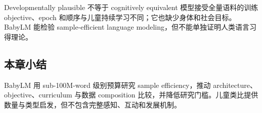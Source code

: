 \begin{warningbox}{Developmentally plausible 不等于 cognitively equivalent}
模型接受全量语料的训练 objective、epoch 和顺序与儿童持续学习不同；它也缺少身体和社会目标。BabyLM 能检验 sample-efficient language modeling，但不能单独证明人类语言习得理论。
\end{warningbox}


\subsection{本章小结}

BabyLM 用 sub-100M-word 级别预算研究 sample efficiency，推动 architecture、objective、curriculum 与数据 composition 比较，并降低研究门槛。儿童类比提供数量与类型启发，但不包含完整感知、互动和发展机制。

